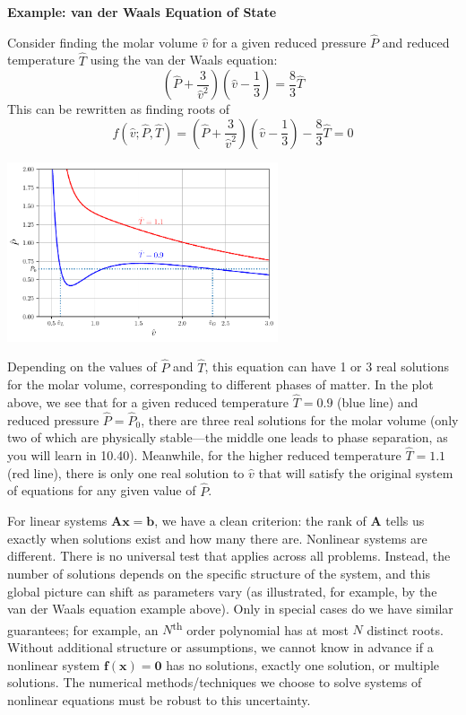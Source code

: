 \begin{exampleBox}
\textbf{Example: van der Waals Equation of State}

Consider finding the molar volume $\hat{v}$ for a given reduced pressure $\hat{P}$ and reduced temperature $\hat{T}$ using the van der Waals equation:
\[
\left(\hat{P} + \frac{3}{\hat{v}^2}\right)\left(\hat{v} - \frac{1}{3}\right) = \frac{8}{3}\hat{T}
\]
This can be rewritten as finding roots of
\[
f(\hat{v}; \hat{P}, \hat{T}) = \left(\hat{P} + \frac{3}{\hat{v}^2}\right)\left(\hat{v} - \frac{1}{3}\right) - \frac{8}{3}\hat{T} = 0
\]

\begin{center}
\includegraphics[width=0.6\textwidth]{figs/nle/vdw_eos.pdf}
\end{center}

Depending on the values of $\hat{P}$ and $\hat{T}$, this equation can have 1 or 3 real solutions for the molar volume, corresponding to different phases of matter. In the plot above, we see that for a given reduced temperature $\hat{T} = 0.9$ (blue line) and reduced pressure $\hat{P} = \hat{P}_0$, there are three real solutions for the molar volume (only two of which are physically stable---the middle one leads to phase separation, as you will learn in 10.40). Meanwhile, for the higher reduced temperature $\hat{T} = 1.1$ (red line), there is only one real solution to $\hat v$ that will satisfy the original system of equations for any given value of $\hat{P}$. %
\end{exampleBox}
    
For linear systems $\mathbf{Ax=b}$, we have a clean criterion: the rank of $\mathbf{A}$ tells us exactly when solutions exist and how many there are. Nonlinear systems are different. There is no universal test that applies across all problems. Instead, the number of solutions depends on the specific structure of the system, and this global picture can shift as parameters vary (as illustrated, for example, by the van der Waals equation example above). Only in special cases do we have similar guarantees; for example, an $N$\textsuperscript{th} order polynomial has at most $N$ distinct roots. Without additional structure or assumptions, we cannot know in advance if a nonlinear system $\mathbf{f(x)=0}$ has no solutions, exactly one solution, or multiple solutions. The numerical methods/techniques we choose to solve systems of nonlinear equations must be robust to this uncertainty.

